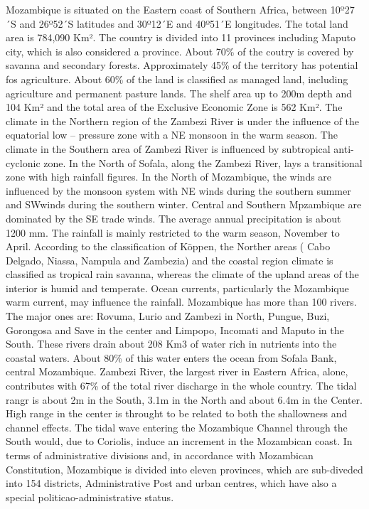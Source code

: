 \documentclass[
]{book}
\begin{document}
Mozambique is situated on the Eastern coast of Southern Africa, between 10º27´S and 26º52´S latitudes and 30º12´E and 40º51´E longitudes. The total land area is 784,090 Km². The country is divided into 11 provinces including Maputo city, which is also considered a province. About 70\% of the coutry is covered by savanna and secondary forests. Approximately 45\% of the territory has potential fos agriculture.
About 60\% of the land is classified as managed land, including agriculture and permanent pasture lands. The shelf area up to 200m depth and 104 Km² and the total area of the Exclusive Economic Zone is 562 Km².
The climate in the Northern region of the Zambezi River is under the influence of the equatorial low -- pressure zone with a NE monsoon in the warm season. The climate in the Southern area of Zambezi River is influenced by subtropical anti-cyclonic zone. In the North of Sofala, along the Zambezi River, lays a transitional zone with high rainfall figures.
In the North of Mozambique, the winds are influenced by the monsoon system with NE winds during the southern summer and SWwinds during the southern winter. Central and Southern Mpzambique are dominated by the SE trade winds.
The average annual precipitation is about 1200 mm. The rainfall is mainly restricted to the warm season, November to April. According to the classification of Köppen, the Norther areas ( Cabo Delgado, Niassa, Nampula and Zambezia) and the coastal region climate is classified as tropical rain savanna, whereas the climate of the upland areas of the interior is humid and temperate. Ocean currents, particularly the Mozambique warm current, may influence the rainfall.
Mozambique has more than 100 rivers. The major ones are: Rovuma, Lurio and Zambezi in North, Pungue, Buzi, Gorongosa and Save in the center and Limpopo, Incomati and Maputo in the South. These rivers drain about 208 Km3 of water rich in nutrients into the coastal waters. About 80\% of this water enters the ocean from Sofala Bank, central Mozambique. Zambezi River, the largest river in Eastern Africa, alone, contributes with 67\% of the total river discharge in the whole country.
The tidal rangr is about 2m in the South, 3.1m in the North and about 6.4m in the Center. High range in the center is throught to be related to both the shallowness and channel effects. The tidal wave entering the Mozambique Channel through the South would, due to Coriolis, induce an increment in the Mozambican coast.
In terms of administrative divisions and, in accordance with Mozambican Constitution, Mozambique is divided into eleven provinces, which are sub-diveded into 154 districts, Administrative Post and urban centres, which have also a special politicao-administrative status.
\end{document}
